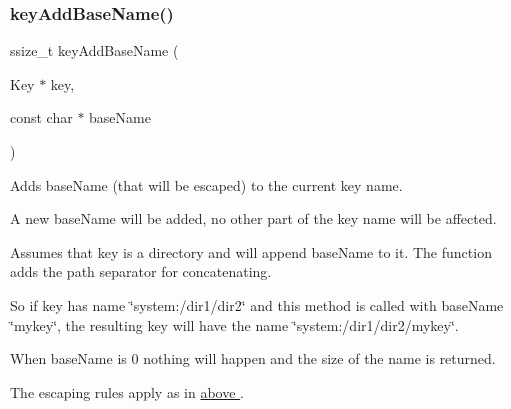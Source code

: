 \subsubsection{\texorpdfstring{key\+Add\+Base\+Name()}{keyAddBaseName()}}
{\footnotesize\ttfamily ssize\+\_\+t key\+Add\+Base\+Name (\begin{DoxyParamCaption}\item[{Key $\ast$}]{key,  }\item[{const char $\ast$}]{base\+Name }\end{DoxyParamCaption})}



Adds {\ttfamily base\+Name} (that will be escaped) to the current key name. 

A new base\+Name will be added, no other part of the key name will be affected.

Assumes that {\ttfamily key} is a directory and will append {\ttfamily base\+Name} to it. The function adds the path separator for concatenating.

So if {\ttfamily key} has name {\ttfamily \char`\"{}system\+:/dir1/dir2\char`\"{}} and this method is called with {\ttfamily base\+Name} {\ttfamily \char`\"{}mykey\char`\"{}}, the resulting key will have the name {\ttfamily \char`\"{}system\+:/dir1/dir2/mykey\char`\"{}}.

When {\ttfamily base\+Name} is 0 nothing will happen and the size of the name is returned.

The escaping rules apply as in \hyperlink{group__keyname}{above }.

